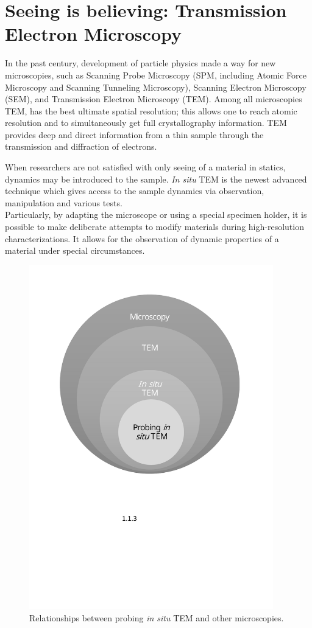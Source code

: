\section{Seeing is believing: Transmission Electron Microscopy}
In the past century, development of particle physics made a way for new microscopies, such as Scanning Probe Microscopy (SPM, including Atomic Force Microscopy and Scanning Tunneling Microscopy), Scanning Electron Microscopy (SEM), and Transmission Electron Microscopy (TEM). Among all microscopies TEM, has the best ultimate spatial resolution; this allows one to reach atomic resolution and to simultaneously get full crystallography information. TEM provides deep and direct information from a thin sample through the transmission and diffraction of electrons. 

When researchers are not satisfied with only seeing of a material in statics, dynamics may be introduced to the sample. \emph{In situ} TEM is the newest advanced technique which gives access to the sample dynamics via observation, manipulation and various tests.\\
Particularly, by adapting the microscope or using a special specimen holder, it is possible to make deliberate attempts to modify materials during high-resolution characterizations. It allows for the observation of dynamic properties of a material under special circumstances.\cite{banhart2008situ}\\

\begin{figure}  
\centering
\includegraphics[width=300pt]{figures/figure1_TEM_As_Microscopy.pdf}
\caption[\emph{In situ} TEM as a microscopy branch]{Relationships between probing \emph{in situ} TEM and other microscopies.
\label{fig:1tam}}
\end{figure}

